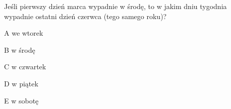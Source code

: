 \begin{tresc}
Jeśli pierwszy dzień marca wypadnie w środę, to w jakim dniu tygodnia wypadnie ostatni dzień czerwca (tego samego roku)?
\end{tresc}
\begin{wariant}{A} we wtorek \end{wariant}
\begin{wariant}{B} w środę \end{wariant}
\begin{wariant}{C} w czwartek \end{wariant}
\begin{wariant}{D} w piątek \end{wariant}
\begin{wariant}{E} w sobotę \end{wariant}
